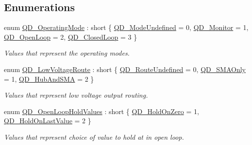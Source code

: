 \subsection*{Enumerations}
\begin{DoxyCompactItemize}
\item 
enum \hyperlink{group___t_cube_quad_gaf6973086315a69c80cbf9099331197b4}{Q\+D\+\_\+\+Operating\+Mode} \+: short \{ \hyperlink{group___t_cube_quad_ggaf6973086315a69c80cbf9099331197b4a679c7a13608937579d18e748718a5f00}{Q\+D\+\_\+\+Mode\+Undefined} = 0, 
\hyperlink{group___t_cube_quad_ggaf6973086315a69c80cbf9099331197b4a01dcbb1ff67f9720066ab854cef8e1ff}{Q\+D\+\_\+\+Monitor} = 1, 
\hyperlink{group___t_cube_quad_ggaf6973086315a69c80cbf9099331197b4a54577cc608eefd01f1512ad5d270472f}{Q\+D\+\_\+\+Open\+Loop} = 2, 
\hyperlink{group___t_cube_quad_ggaf6973086315a69c80cbf9099331197b4a625bd0c1c473afa1a1b650f952dad629}{Q\+D\+\_\+\+Closed\+Loop} = 3
 \}\begin{DoxyCompactList}\small\item\em Values that represent the operating modes. \end{DoxyCompactList}
\item 
enum \hyperlink{group___t_cube_quad_gac883e8fbad1f829af985c3a4fd2e566d}{Q\+D\+\_\+\+Low\+Voltage\+Route} \+: short \{ \hyperlink{group___t_cube_quad_ggac883e8fbad1f829af985c3a4fd2e566dab9af17dbfc45225823112ab794329328}{Q\+D\+\_\+\+Route\+Undefined} = 0, 
\hyperlink{group___t_cube_quad_ggac883e8fbad1f829af985c3a4fd2e566da650dd50fdb4ccdd5f5de352f8e708fe1}{Q\+D\+\_\+\+S\+M\+A\+Only} = 1, 
\hyperlink{group___t_cube_quad_ggac883e8fbad1f829af985c3a4fd2e566dade7d36fed37407b1fc107a2ffd1e34e3}{Q\+D\+\_\+\+Hub\+And\+S\+MA} = 2
 \}\begin{DoxyCompactList}\small\item\em Values that represent low voltage output routing. \end{DoxyCompactList}
\item 
enum \hyperlink{group___t_cube_quad_ga499dfc94972cba399344f62c70cd37ff}{Q\+D\+\_\+\+Open\+Loop\+Hold\+Values} \+: short \{ \hyperlink{group___t_cube_quad_gga499dfc94972cba399344f62c70cd37ffa57f4e16b6de1b6777c8fc670f8e21038}{Q\+D\+\_\+\+Hold\+On\+Zero} = 1, 
\hyperlink{group___t_cube_quad_gga499dfc94972cba399344f62c70cd37ffac8c70c96f59c4b2e7f826b84f5426b96}{Q\+D\+\_\+\+Hold\+On\+Last\+Value} = 2
 \}\begin{DoxyCompactList}\small\item\em Values that represent choice of value to hold at in open loop. \end{DoxyCompactList}

\end{DoxyCompactItemize}
